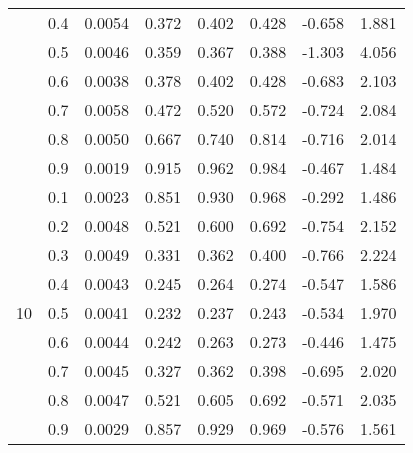 \documentclass[11pt,a4paper]{report}
\begin{document}
\begin{longtable}{ | c | c || c | c | c | c | c | c | }
 & 0.4 & 0.0054 & 0.372 & 0.402 & 0.428 & -0.658 & 1.881 \\
 & 0.5 & 0.0046 & 0.359 & 0.367 & 0.388 & -1.303 & 4.056 \\
 & 0.6 & 0.0038 & 0.378 & 0.402 & 0.428 & -0.683 & 2.103 \\
 & 0.7 & 0.0058 & 0.472 & 0.520 & 0.572 & -0.724 & 2.084 \\
 & 0.8 & 0.0050 & 0.667 & 0.740 & 0.814 & -0.716 & 2.014 \\
 & 0.9 & 0.0019 & 0.915 & 0.962 & 0.984 & -0.467 & 1.484 \\
 \hline
\multirow{9}{*}{10} & 0.1 & 0.0023 & 0.851 & 0.930 & 0.968 & -0.292 & 1.486 \\
 & 0.2 & 0.0048 & 0.521 & 0.600 & 0.692 & -0.754 & 2.152 \\
 & 0.3 & 0.0049 & 0.331 & 0.362 & 0.400 & -0.766 & 2.224 \\
 & 0.4 & 0.0043 & 0.245 & 0.264 & 0.274 & -0.547 & 1.586 \\
 & 0.5 & 0.0041 & 0.232 & 0.237 & 0.243 & -0.534 & 1.970 \\
 & 0.6 & 0.0044 & 0.242 & 0.263 & 0.273 & -0.446 & 1.475 \\
 & 0.7 & 0.0045 & 0.327 & 0.362 & 0.398 & -0.695 & 2.020 \\
 & 0.8 & 0.0047 & 0.521 & 0.605 & 0.692 & -0.571 & 2.035 \\
 & 0.9 & 0.0029 & 0.857 & 0.929 & 0.969 & -0.576 & 1.561 \\
 \hline
\hline
\end{longtable}
\end{document}
